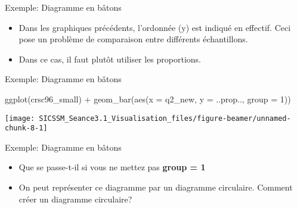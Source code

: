 \documentclass[
  ignorenonframetext,
]{beamer}
\newenvironment{Shaded}{\begin{snugshade}}{\end{snugshade}}
\newcommand{\AttributeTok}[1]{\textcolor[rgb]{0.77,0.63,0.00}{#1}}
\newcommand{\DecValTok}[1]{\textcolor[rgb]{0.00,0.00,0.81}{#1}}
\newcommand{\FunctionTok}[1]{\textcolor[rgb]{0.00,0.00,0.00}{#1}}
\newcommand{\NormalTok}[1]{#1}
\newcommand{\SpecialCharTok}[1]{\textcolor[rgb]{0.00,0.00,0.00}{#1}}
\providecommand{\tightlist}{%
  \setlength{\itemsep}{0pt}\setlength{\parskip}{0pt}}
\begin{document}
\begin{frame}{Exemple: Diagramme en bâtons}
\protect\hypertarget{exemple-diagramme-en-buxe2tons-1}{}
\begin{itemize}
\tightlist
\item
  Dans les graphiques précédents, l'ordonnée (y) est indiqué en
  effectif. Ceci pose un problème de comparaison entre différents
  échantillons.
\item
  Dans ce cas, il faut plutôt utiliser les proportions.
\end{itemize}
\end{frame}

\begin{frame}[fragile]{Exemple: Diagramme en bâtons}
\protect\hypertarget{exemple-diagramme-en-buxe2tons-2}{}
\begin{Shaded}
\begin{Highlighting}[]
\FunctionTok{ggplot}\NormalTok{(crsc96\_small) }\SpecialCharTok{+}
  \FunctionTok{geom\_bar}\NormalTok{(}\FunctionTok{aes}\NormalTok{(}\AttributeTok{x =}\NormalTok{ q2\_new, }\AttributeTok{y =}\NormalTok{ ..prop.., }\AttributeTok{group =} \DecValTok{1}\NormalTok{))}
\end{Highlighting}
\end{Shaded}

\begin{center}\texttt{[image: SICSSM\_Seance3.1\_Visualisation\_files/figure-beamer/unnamed-chunk-8-1]} \end{center}
\end{frame}

\begin{frame}{Exemple: Diagramme en bâtons}
\protect\hypertarget{exemple-diagramme-en-buxe2tons-3}{}
\begin{itemize}
\item
  Que se passe-t-il si vous ne mettez pas \textbf{group = 1}
\item
  On peut représenter ce diagramme par un diagramme circulaire. Comment
  créer un diagramme circulaire?
\end{itemize}
\end{frame}
\end{document}
